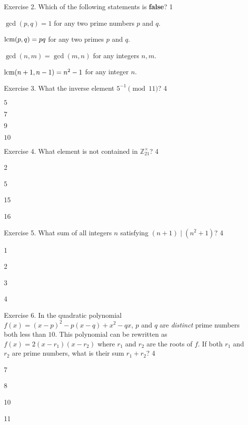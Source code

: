 \documentclass[../lecture-notes-148x210.tex]{subfiles}
\begin{document}
\begin{xexercise}
    {Exercise 2.}
    {Which of the following statements is \textbf{false}?}
    {1}
    {
        \item $\gcd(p,q)=1$ for any two prime numbers $p$ and $q$.
        \item $\text{lcm}(p,q)=pq$ for any two primes $p$ and $q$.
        \item $\gcd(n,m) = \gcd(m,n)$ for any integers $n,m$.
        \item $\text{lcm}(n+1,n-1) = n^2-1$ for any integer $n$.
    }
\end{xexercise}

\newpage

\begin{xexercise}
    {Exercise 3.}
    {What the inverse element $5^{-1} \pmod{11}$?}
    {4}
    {
        \item $5$
        \item $7$
        \item $9$
        \item $10$
    }
\end{xexercise}

\begin{xexercise}
    {Exercise 4.}
    {What element is not contained in $\mathbb{Z}_{21}^{\times}$?}
    {4}
    {
        \item 2 
        \item 5
        \item 15
        \item 16
    }
\end{xexercise}

\begin{xexercise}
    {Exercise 5.}
    {What sum of all integers $n$ satisfying $(n + 1) \mid (n^2 + 1)$?}
    {4}
    {
        \item 1
        \item 2
        \item 3
        \item 4
    }
\end{xexercise}

\begin{xexercise}
    {Exercise 6.} { In the quadratic polynomial $f(x) = (x-p)^2-p(x-q)+x^2-qx$,
    $p$ and $q$ are \emph{distinct} prime numbers both less than $10$. This
    polynomial can be rewritten as $f(x) = 2(x-r_1)(x-r_2)$ where $r_1$ and
    $r_2$ are the roots of $f$. If both $r_1$ and $r_2$ are prime numbers, what
    is their sum $r_1+r_2$? } {4} {
        \item 7
        \item 8
        \item 10
        \item 11
    }
\end{xexercise}
\end{document}
